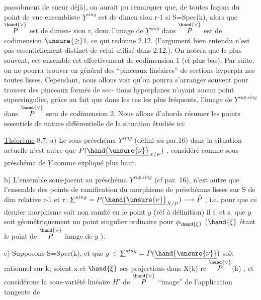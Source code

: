 
passabment de sueur déjà), on aurait pu remarquer que,  de
toutes façons du point de vue ensembliste $\underline{Y}^{sing}$ est de dimen%
sion r-1  si S=Spec(k), alors que $\overset{\hand{\vee}}{P}$ est de dimen-%
sion r, donc l'image de $\underline{Y}^{sing}$ dans $\overset{\hand{\vee}}{P}$ est de codimension $\unsure{\geq}$1, ce qui redonne
2.12. (l'argument bien entendu n'est pas essentiellement distinct de
celui utilisé dans 2.12.). On notera que le plus souvent, cet ensemble
est effectivement de codimension 1 (cf plus bas). Par suite, on ne
pourra trouver en général des ``pinceaux linéaires'' de sections hyperpla%
nes toutes   lisses. Cependant, nous allons voir qu'on
pourra s'arranger souvent pour  trouver des pinceaux formés de sec-%
tions hyperplanes n'ayant aucun point supersingulier, grâce au fait que
dans les cas les plus fréquents, l'image de $\underline{Y}^{sup\ sing}$ dans $\overset{\hand{\vee}}{P}$ sera de
codimension 2. Nous allons d'abords résumer les points essentiels
de nature différentielle de la situation étudiée ici:

\uline{Théorème} 8.7. a) Le sous-préschéma $\underline{Y}^{sing}$ (défini au par.16) dans
la situation actuelle n'est autre que $P(\underline{\hand{\unsure{\nu}}}_{X/P})$ , considéré comme
sous-préschéma de $\underline{Y}$ comme expliqué plus haut.

b) L'ensemble sous-jacent au préschéma $\underline{Y}^{sup\ sing}$ (cf par. 16), 
 n'est autre que l'ensemble des points de ramification du morphisme de préschémas lisses sur S de dim relative r-1 et r:
$\underline{Y}^{sing} = P(\underline{\hand{\unsure{\nu}}}_{X/P}) \longrightarrow \check{P}$ , i.e. pour que ce dernier morphisme soit
non ramfié en le point $y$ (réf à définition) il f. et s. que $y$
soit géométriquement un point singulier ordinaire pour $\phi_{\hand{\xi}}$ ($\hand{\xi}$ étant le
point de $\overset{\hand{\vee}}{P}$ image de $y$ ).

c) Supposons S=Spec(k), et que $y$ $\in$$\underline{Y}^{sing} = P(\underline{\hand{\unsure{\nu}}})$ soit rationnel sur k; soient x
et $\hand{\xi}$ ses projections dans X(k) re $\overset{\hand{\vee}}{P}$(k) , et considérons la 
sous-variété linéaire $H'$ de $\overset{\hand{\vee}}{P}$ ``image'' de l'application tangente de

